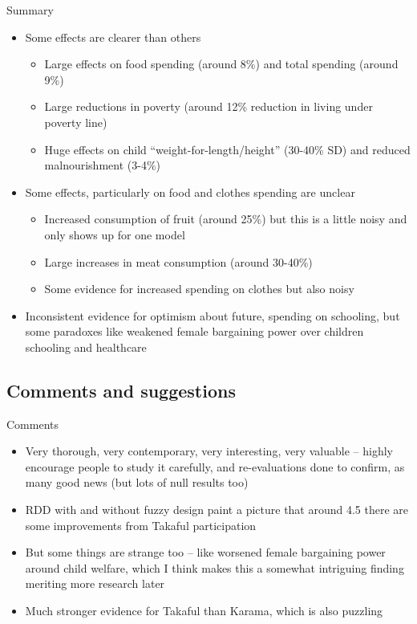 \documentclass{beamer}
\begin{document}
\begin{frame}{Summary}

\begin{itemize}
\item Some effects are clearer than others

	\begin{itemize}
	\item Large effects on food spending (around 8\%) and total spending (around 9\%)
	\item Large reductions in poverty (around 12\% reduction in living under poverty line)
	\item Huge effects on child ``weight-for-length/height'' (30-40\% SD) and reduced malnourishment (3-4\%)
	\end{itemize}
\item Some effects, particularly on food and clothes spending are unclear
	\begin{itemize}
	\item Increased consumption of fruit (around 25\%) but this is a little noisy and only shows up for one model
	\item Large increases in meat consumption (around 30-40\%)
	\item Some evidence for increased spending on clothes but also noisy
	\end{itemize}
\item Inconsistent evidence for optimism about future, spending on schooling, but some paradoxes like weakened female bargaining power over children schooling and healthcare
\end{itemize}

\end{frame}




\subsection{Comments and suggestions}

\begin{frame}{Comments}

\begin{itemize}
\item Very thorough, very contemporary, very interesting, very valuable -- highly encourage people to study it carefully, and re-evaluations done to confirm, as many good news (but lots of null results too)
\item RDD with and without fuzzy design paint a picture that around 4.5 there are some improvements from Takaful participation
\item But some things are strange too -- like worsened female bargaining power around child welfare, which I think makes this a somewhat intriguing finding meriting more research later
\item Much stronger evidence for Takaful than Karama, which is also puzzling

\end{itemize}

\end{frame}
\end{document}
